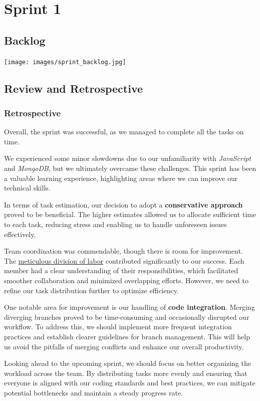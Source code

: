 \documentclass{article}
\begin{document}
\section{Sprint 1}

\subsection{Backlog}
\texttt{[image: images/sprint\_backlog.jpg]}

\subsection{Review and Retrospective}
\subsubsection{Retrospective}
Overall, the sprint was successful, as we managed to complete all the tasks on time.

We experienced some minor slowdowns due to our unfamiliarity with \textit{JavaScript} and \textit{MongoDB}, but we ultimately overcame these challenges. This sprint has been a valuable learning experience, highlighting areas where we can improve our technical skills.

In terms of task estimation, our decision to adopt a \textbf{conservative approach} proved to be beneficial. The higher estimates allowed us to allocate sufficient time to each task, reducing stress and enabling us to handle unforeseen issues effectively.

Team coordination was commendable, though there is room for improvement. The \underline{meticulous division of labor} contributed significantly to our success. Each member had a clear understanding of their responsibilities, which facilitated smoother collaboration and minimized overlapping efforts. However, we need to refine our task distribution further to optimize efficiency.

One notable area for improvement is our handling of \textbf{code integration}. Merging diverging branches proved to be time-consuming and occasionally disrupted our workflow. To address this, we should implement more frequent integration practices and establish clearer guidelines for branch management. This will help us avoid the pitfalls of merging conflicts and enhance our overall productivity.

Looking ahead to the upcoming sprint, we should focus on better organizing the workload across the team. By distributing tasks more evenly and ensuring that everyone is aligned with our coding standards and best practices, we can mitigate potential bottlenecks and maintain a steady progress rate.
\end{document}
